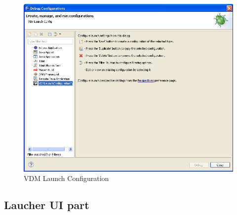 \begin{figure}[htb]
\centering
\includegraphics[width=\textwidth]{figures/launchConfigurationType}
\caption{VDM Launch Configuration}
\label{fig:launchConfigurationType}
\end{figure}

\subsection{Laucher UI part}

